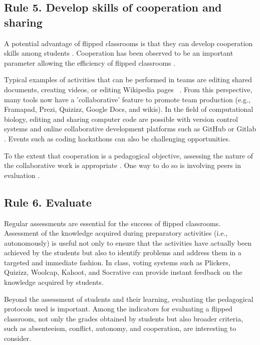 \documentclass[10pt,letterpaper]{article}
\begin{document}
\subsection{Rule 5. Develop skills of cooperation and sharing}

A potential advantage of flipped classrooms is that they can develop cooperation skills among students \cite{strayer_how_2012}. 
Cooperation has been observed to be an important parameter allowing the efficiency of flipped classrooms \cite{foldnes_flipped_2016}.

Typical examples of activities that can be performed in teams are editing shared documents, creating videos, or editing Wikipedia pages ~\cite{logan_ten_2010}. From this perspective, many tools now have a 'collaborative' feature to promote team production (e.g., Framapad, Prezi, Quizizz, Google Docs, and wikis). 
In the field of computational biology, editing and sharing computer code \cite{abdollahi2018meet} are possible with version control systems and online collaborative development platforms such as GitHub or Gitlab \cite{blischak_quick_2016}. Events such as coding hackathons can also be challenging opportunities.

To the extent that cooperation is a pedagogical objective, assessing the nature of the collaborative work is appropriate \cite{lebrun_vers_2016}. One way to do so is involving peers in evaluation \cite{lopez}.


\subsection{Rule 6. Evaluate}

Regular assessments are essential for the success of flipped classrooms. Assessment of the knowledge acquired during preparatory
activities (i.e., autonomously) is useful not only to ensure that the activities have actually been achieved by the students but also to identify problems and address them in a targeted and immediate fashion. 
In class, voting systems such as Plickers, Quizizz, Woolcap, Kahoot, and Socrative can provide instant feedback on the knowledge 
acquired by students.

Beyond the assessment of students and their learning, evaluating the pedagogical protocols used is important. 
Among the indicators for evaluating a flipped classroom, not only the grades obtained by students 
but also broader criteria, such as absenteeism, conflict, autonomy, and cooperation, are interesting to consider.
\end{document}

